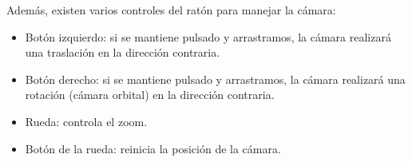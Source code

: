 Además, existen varios controles del ratón para manejar la cámara:
\begin{itemize}
	\item Botón izquierdo: si se mantiene pulsado y arrastramos, la cámara realizará una traslación en la dirección contraria.
	\item Botón derecho: si se mantiene pulsado y arrastramos, la cámara realizará una rotación (cámara orbital) en la dirección contraria.
	\item Rueda: controla el zoom.
	\item Botón de la rueda: reinicia la posición de la cámara.
\end{itemize}

\endinput
